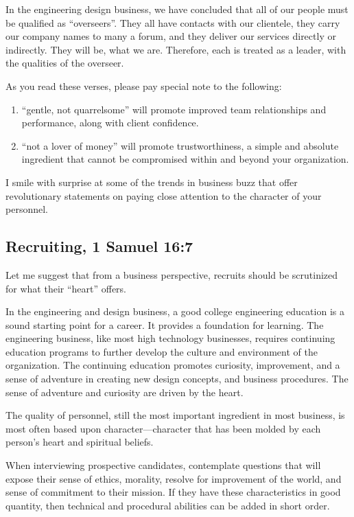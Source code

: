 \documentclass[12pt]{memoir}
\begin{document}
In the engineering design business, we have concluded that all of
our people must be qualified as ``overseers''. They all have contacts
with our clientele, they carry our company names to many a forum,
and they deliver our services directly or indirectly. They will be,
what we are. Therefore, each is treated as a leader, with the qualities
of the overseer.

As you read these verses, please pay special note to the following:

\begin{enumerate}
\item ``gentle, not quarrelsome'' will promote improved team relationships and performance, along with client confidence.

\item ``not a lover of money'' will promote trustworthiness, a simple and absolute ingredient that cannot be compromised within and beyond your organization. 
\end{enumerate}

I smile with surprise at some of the trends in business buzz that offer revolutionary statements on paying close attention to the character of your personnel.

\subsection[Recruiting]{Recruiting, 1 Samuel 16:7}

Let me suggest that from a business perspective, recruits should be
scrutinized for what their ``heart'' offers.

In the engineering and design business, a good college engineering
education is a sound starting point for a career. It provides a foundation
for learning. The engineering business, like most high technology
businesses, requires continuing education programs to further develop
the culture and environment of the organization. The continuing education
promotes curiosity, improvement, and a sense of adventure in creating
new design concepts, and business procedures. The sense of adventure
and curiosity are driven by the heart.

The quality of personnel, still the most important ingredient in most business, is most often based upon character---character that has been molded by each person's heart and spiritual beliefs.

When interviewing prospective candidates, contemplate questions that
will expose their sense of ethics, morality, resolve for improvement
of the world, and sense of commitment to their mission. If they have
these characteristics in good quantity, then technical and procedural
abilities can be added in short order.\emph{ }
\end{document}
